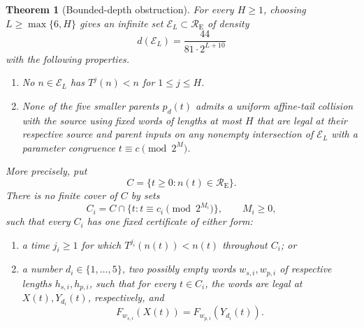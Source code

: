\documentclass[11pt,letterpaper]{article}
\newtheorem{theorem}{Theorem}
\begin{document}
\begin{theorem}[Bounded-depth obstruction]\label{thm:BoundedDepthObstruction}
For every \(H\ge1\), choosing \(L\ge\max\{6,H\}\) gives an infinite
set \(\mathcal E_L\subset\mathcal R_{\mathrm E}\) of density
\[
d(\mathcal E_L)=\frac{44}{81\cdot2^{L+10}}
\]
with the following properties.
\begin{enumerate}
\item No \(n\in\mathcal E_L\) has \(T^j(n)<n\) for
      \(1\le j\le H\).
\item None of the five smaller parents \(p_d(t)\) admits a uniform
affine-tail collision with the source using fixed words of lengths at most
\(H\) that are legal at their respective source and parent inputs on any
nonempty intersection of \(\mathcal E_L\) with a parameter congruence
\(t\equiv c\pmod{2^M}\).
\end{enumerate}
More precisely, put
\[
C=\{t\ge0:n(t)\in\mathcal R_{\mathrm E}\}.
\]
There is no finite cover of \(C\) by sets
\[
C_i=C\cap\{t:t\equiv c_i\pmod{2^{M_i}}\},
\qquad M_i\ge0,
\]
such that every \(C_i\) has one fixed certificate of either form:
\begin{enumerate}[label=(\alph*)]
\item a time \(j_i\ge1\) for which \(T^{j_i}(n(t))<n(t)\) throughout
      \(C_i\); or
\item a number \(d_i\in\{1,\ldots,5\}\), two possibly empty words
      \(w_{s,i},w_{p,i}\) of respective lengths \(h_{s,i},h_{p,i}\),
      such that for every \(t\in C_i\), the words are legal at
      \(X(t),Y_{d_i}(t)\), respectively, and
\[
F_{w_{s,i}}(X(t))=F_{w_{p,i}}(Y_{d_i}(t)).
\]
\end{enumerate}
\end{theorem}
\end{document}
